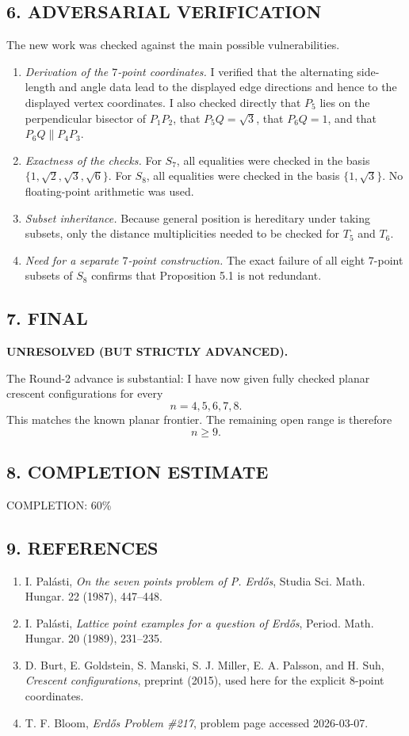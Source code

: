 \subsection*{6. ADVERSARIAL VERIFICATION}
The new work was checked against the main possible vulnerabilities.
\begin{enumerate}
\item \emph{Derivation of the $7$-point coordinates.} I verified that the alternating side-length and angle data lead to the displayed edge directions and hence to the displayed vertex coordinates. I also checked directly that $P_5$ lies on the perpendicular bisector of $P_1P_2$, that $P_5Q=\sqrt3$, that $P_6Q=1$, and that $P_6Q\parallel P_4P_3$.
\item \emph{Exactness of the checks.} For $S_7$, all equalities were checked in the basis $\{1,\sqrt2,\sqrt3,\sqrt6\}$. For $S_8$, all equalities were checked in the basis $\{1,\sqrt3\}$. No floating-point arithmetic was used.
\item \emph{Subset inheritance.} Because general position is hereditary under taking subsets, only the distance multiplicities needed to be checked for $T_5$ and $T_6$.
\item \emph{Need for a separate $7$-point construction.} The exact failure of all eight $7$-point subsets of $S_8$ confirms that Proposition 5.1 is not redundant.
\end{enumerate}

\subsection*{7. FINAL}
\textbf{UNRESOLVED (BUT STRICTLY ADVANCED).}

The Round-2 advance is substantial: I have now given fully checked planar crescent configurations for every
\[
n=4,5,6,7,8.
\]
This matches the known planar frontier. The remaining open range is therefore
\[
n\geq 9.
\]

\subsection*{8. COMPLETION ESTIMATE}
COMPLETION: 60\%

\subsection*{9. REFERENCES}
\begin{enumerate}
\item I. Pal\'asti, \emph{On the seven points problem of P. Erd\H{o}s}, Studia Sci. Math. Hungar. 22 (1987), 447--448.
\item I. Pal\'asti, \emph{Lattice point examples for a question of Erd\H{o}s}, Period. Math. Hungar. 20 (1989), 231--235.
\item D. Burt, E. Goldstein, S. Manski, S. J. Miller, E. A. Palsson, and H. Suh, \emph{Crescent configurations}, preprint (2015), used here for the explicit $8$-point coordinates.
\item T. F. Bloom, \emph{Erd\H{o}s Problem \#217}, problem page accessed 2026-03-07.
\end{enumerate}
